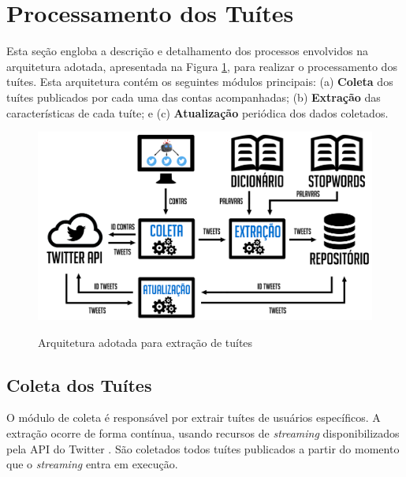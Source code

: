 \documentclass[oneside,openright,12pt]{ufsm_2015} %
\begin{document}
\section{Processamento dos Tuítes}
\label{sec:prop-processamento}

    \par Esta seção engloba a descrição e detalhamento dos processos envolvidos na arquitetura adotada, apresentada na Figura \ref{fig:arquitetura}, para realizar o processamento dos tuítes. Esta arquitetura contém os seguintes módulos principais: (a) \textbf{Coleta} dos tuítes publicados por cada uma das contas acompanhadas; (b) \textbf{Extração} das características de cada tuíte; e (c) \textbf{Atualização} periódica dos dados coletados.
    
    \begin{figure}[ht]
        \caption{Arquitetura adotada para extração de tuítes}
        \centering
        \includegraphics[width=1\textwidth]{figuras/arquitetura.png}
        \vspace{\baselineskip} %
        \label{fig:arquitetura}
    \end{figure}


\subsection{Coleta dos Tuítes}
\label{sec:prop-coleta}

    \par O módulo de coleta é responsável por extrair tuítes de usuários específicos. A extração ocorre de forma contínua, usando recursos de \textit{streaming} disponibilizados pela API do Twitter \cite{site:twitter-api}. São coletados todos tuítes publicados a partir do momento que o \textit{streaming} entra em execução.
    
\end{document}
